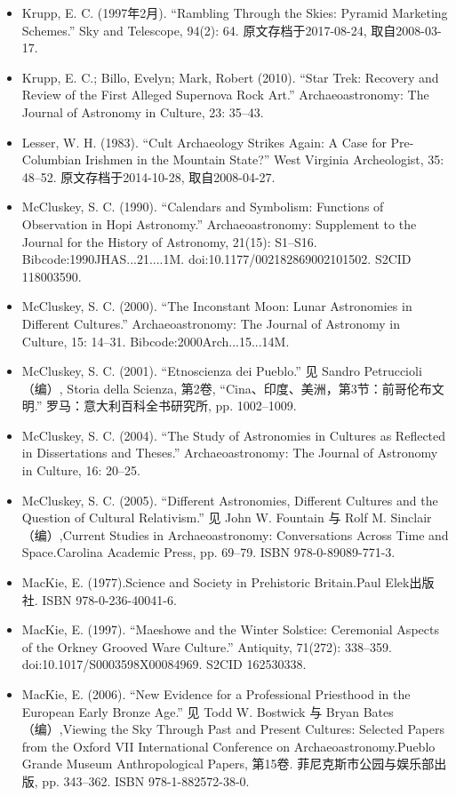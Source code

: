 \begin{itemize}
    \item Krupp, E. C. (1997年2月). “Rambling Through the Skies: Pyramid Marketing Schemes.” Sky and Telescope, 94(2): 64. 原文存档于2017-08-24, 取自2008-03-17.
    \item Krupp, E. C.; Billo, Evelyn; Mark, Robert (2010). “Star Trek: Recovery and Review of the First Alleged Supernova Rock Art.” Archaeoastronomy: The Journal of Astronomy in Culture, 23: 35–43.
    \item Lesser, W. H. (1983). “Cult Archaeology Strikes Again: A Case for Pre-Columbian Irishmen in the Mountain State?” West Virginia Archeologist, 35: 48–52. 原文存档于2014-10-28, 取自2008-04-27.
    \item McCluskey, S. C. (1990). “Calendars and Symbolism: Functions of Observation in Hopi Astronomy.” Archaeoastronomy: Supplement to the Journal for the History of Astronomy, 21(15): S1–S16. Bibcode:1990JHAS...21....1M. doi:10.1177/002182869002101502. S2CID 118003590.
    \item McCluskey, S. C. (2000). “The Inconstant Moon: Lunar Astronomies in Different Cultures.” Archaeoastronomy: The Journal of Astronomy in Culture, 15: 14–31. Bibcode:2000Arch...15...14M.
    \item McCluskey, S. C. (2001). “Etnoscienza dei Pueblo.” 见 Sandro Petruccioli（编）, Storia della Scienza, 第2卷, “Cina、印度、美洲，第3节：前哥伦布文明.” 罗马：意大利百科全书研究所, pp. 1002–1009.
    \item McCluskey, S. C. (2004). “The Study of Astronomies in Cultures as Reflected in Dissertations and Theses.” Archaeoastronomy: The Journal of Astronomy in Culture, 16: 20–25.
    \item McCluskey, S. C. (2005). “Different Astronomies, Different Cultures and the Question of Cultural Relativism.” 见 John W. Fountain 与 Rolf M. Sinclair（编）,Current Studies in Archaeoastronomy: Conversations Across Time and Space.Carolina Academic Press, pp. 69–79. ISBN 978-0-89089-771-3.
    \item MacKie, E. (1977).Science and Society in Prehistoric Britain.Paul Elek出版社. ISBN 978-0-236-40041-6.
    \item MacKie, E. (1997). “Maeshowe and the Winter Solstice: Ceremonial Aspects of the Orkney Grooved Ware Culture.” Antiquity, 71(272): 338–359. doi:10.1017/S0003598X00084969. S2CID 162530338.
    \item MacKie, E. (2006). “New Evidence for a Professional Priesthood in the European Early Bronze Age.” 见 Todd W. Bostwick 与 Bryan Bates（编）,Viewing the Sky Through Past and Present Cultures: Selected Papers from the Oxford VII International Conference on Archaeoastronomy.Pueblo Grande Museum Anthropological Papers, 第15卷. 菲尼克斯市公园与娱乐部出版, pp. 343–362. ISBN 978-1-882572-38-0.

\end{itemize}
